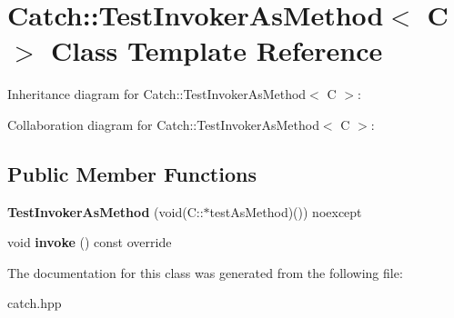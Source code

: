 \hypertarget{classCatch_1_1TestInvokerAsMethod}{}\section{Catch\+:\+:Test\+Invoker\+As\+Method$<$ C $>$ Class Template Reference}
\label{classCatch_1_1TestInvokerAsMethod}


Inheritance diagram for Catch\+:\+:Test\+Invoker\+As\+Method$<$ C $>$\+:


Collaboration diagram for Catch\+:\+:Test\+Invoker\+As\+Method$<$ C $>$\+:
\subsection*{Public Member Functions}
\begin{DoxyCompactItemize}
\item 
{\bfseries Test\+Invoker\+As\+Method} (void(C\+::$\ast$test\+As\+Method)()) noexcept\hypertarget{classCatch_1_1TestInvokerAsMethod_a119c4bdbbdd95c42859c18541987a1a4}{}\label{classCatch_1_1TestInvokerAsMethod_a119c4bdbbdd95c42859c18541987a1a4}

\item 
void {\bfseries invoke} () const override\hypertarget{classCatch_1_1TestInvokerAsMethod_a8115a06efe273f4112ec0b5452c1b5f2}{}\label{classCatch_1_1TestInvokerAsMethod_a8115a06efe273f4112ec0b5452c1b5f2}

\end{DoxyCompactItemize}


The documentation for this class was generated from the following file\+:\begin{DoxyCompactItemize}
\item 
catch.\+hpp\end{DoxyCompactItemize}
